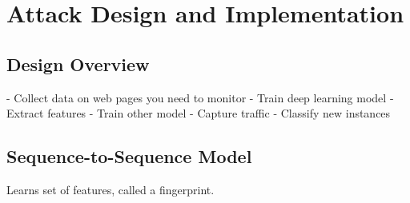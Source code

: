 \section{Attack Design and Implementation}

\subsection{Design Overview}

- Collect data on web pages you need to monitor
- Train deep learning model
- Extract features
- Train other model
- Capture traffic
- Classify new instances


\subsection{Sequence-to-Sequence Model}

Learns set of features, called a fingerprint.
